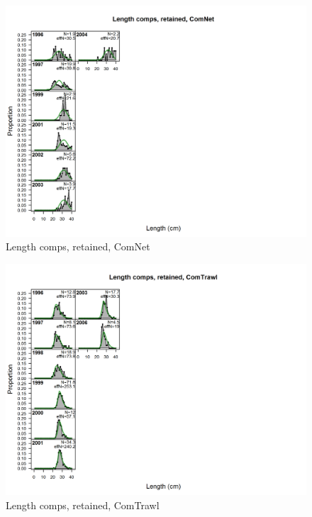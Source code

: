 \documentclass[12pt,]{article}
\begin{document}
\begin{figure}[htbp]
\centering
\includegraphics{./r4ss/plots_mod1/comp_lenfit_flt2mkt2.png}
\caption{Length comps, retained, ComNet
\label{fig:mod1_2_comp_lenfit_flt2mkt2}}
\end{figure}

\begin{figure}[htbp]
\centering
\includegraphics{./r4ss/plots_mod1/comp_lenfit_flt3mkt2.png}
\caption{Length comps, retained, ComTrawl
\label{fig:mod1_3_comp_lenfit_flt3mkt2}}
\end{figure}
\end{document}
